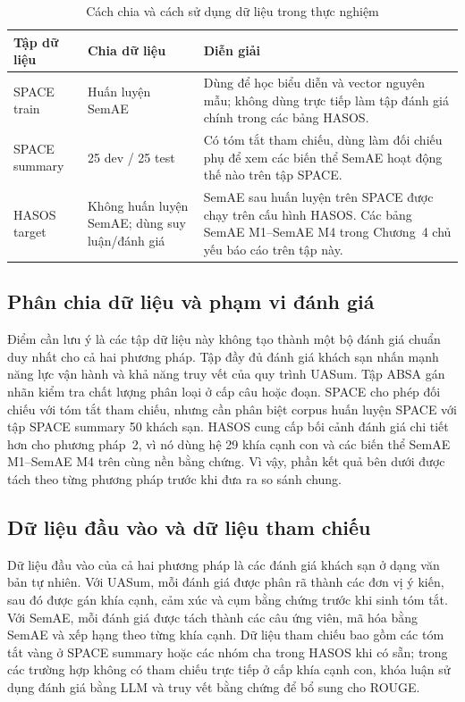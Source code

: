 \begin{table}[tbp]
\centering
\caption{Cách chia và cách sử dụng dữ liệu trong thực nghiệm}
\label{tab:dataset-splits}
\small
\setlength{\tabcolsep}{4pt}
\renewcommand{\arraystretch}{1.12}
\begin{tabularx}{\textwidth}{L{0.20\textwidth} L{0.24\textwidth} Y}
\toprule
\textbf{Tập dữ liệu} & \textbf{Chia dữ liệu} & \textbf{Diễn giải} \\
\midrule
SPACE train & Huấn luyện SemAE & Dùng để học biểu diễn và vector nguyên mẫu; không dùng trực tiếp làm tập đánh giá chính trong các bảng HASOS. \\
SPACE summary & \num{25} dev / \num{25} test & Có tóm tắt tham chiếu, dùng làm đối chiếu phụ để xem các biến thể SemAE hoạt động thế nào trên tập SPACE. \\
HASOS target & Không huấn luyện SemAE; dùng suy luận/đánh giá & SemAE sau huấn luyện trên SPACE được chạy trên cấu hình HASOS. Các bảng SemAE M1--SemAE M4 trong Chương~4 chủ yếu báo cáo trên tập này. \\
\bottomrule
\end{tabularx}
\end{table}

\subsection{Phân chia dữ liệu và phạm vi đánh giá}

Điểm cần lưu ý là các tập dữ liệu này không tạo thành một bộ đánh giá chuẩn duy nhất cho cả hai phương pháp. Tập đầy đủ đánh giá khách sạn nhấn mạnh năng lực vận hành và khả năng truy vết của quy trình UASum. Tập ABSA gán nhãn kiểm tra chất lượng phân loại ở cấp câu hoặc đoạn. SPACE cho phép đối chiếu với tóm tắt tham chiếu, nhưng cần phân biệt corpus huấn luyện SPACE với tập SPACE summary 50 khách sạn. HASOS cung cấp bối cảnh đánh giá chi tiết hơn cho phương pháp~2, vì nó dùng hệ 29 khía cạnh con và các biến thể SemAE M1--SemAE M4 trên cùng nền bằng chứng. Vì vậy, phần kết quả bên dưới được tách theo từng phương pháp trước khi đưa ra so sánh chung.

\subsection{Dữ liệu đầu vào và dữ liệu tham chiếu}

Dữ liệu đầu vào của cả hai phương pháp là các đánh giá khách sạn ở dạng văn bản tự nhiên. Với UASum, mỗi đánh giá được phân rã thành các đơn vị ý kiến, sau đó được gán khía cạnh, cảm xúc và cụm bằng chứng trước khi sinh tóm tắt. Với SemAE, mỗi đánh giá được tách thành các câu ứng viên, mã hóa bằng SemAE và xếp hạng theo từng khía cạnh. Dữ liệu tham chiếu bao gồm các tóm tắt vàng ở SPACE summary hoặc các nhóm cha trong HASOS khi có sẵn; trong các trường hợp không có tham chiếu trực tiếp ở cấp khía cạnh con, khóa luận sử dụng đánh giá bằng LLM và truy vết bằng chứng để bổ sung cho ROUGE.

